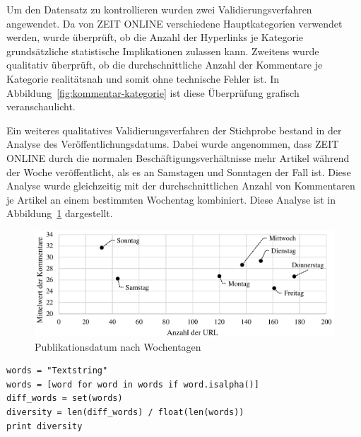 \documentclass[12pt,a4paper,oneside]{article}
\begin{document}
\begin{titlepage}
\begin{flushleft}
Um den Datensatz zu kontrollieren wurden zwei Validierungsverfahren angewendet. Da von ZEIT ONLINE verschiedene Hauptkategorien verwendet werden, wurde überprüft, ob die Anzahl der Hyperlinks je Kategorie grundsätzliche statistische Implikationen zulassen kann. Zweitens wurde qualitativ
überprüft, ob die durchschnittliche Anzahl der Kommentare je Kategorie realitätsnah und somit ohne technische Fehler ist. In Abbildung~\ref{fig:kommentar-kategorie} ist diese Überprüfung grafisch veranschaulicht.

Ein weiteres qualitatives Validierungsverfahren der Stichprobe bestand in der Analyse des Veröffentlichungsdatums. Dabei wurde angenommen, dass ZEIT ONLINE durch die normalen Beschäftigungsverhältnisse mehr Artikel während der Woche veröffentlicht, als es an Samstagen und Sonntagen der Fall ist. Diese Analyse wurde gleichzeitig mit der durchschnittlichen Anzahl von Kommentaren je Artikel an einem bestimmten Wochentag kombiniert. Diese Analyse ist in Abbildung~\ref{fig:kommentar-wochentag} dargestellt.

\begin{figure}[h!]
\includegraphics[width=.90\textwidth]{Kom_Wt.pdf}
\caption{Publikationsdatum nach Wochentagen}
\label{fig:kommentar-wochentag}
\end{figure}

\newpage

\begin{footnotesize}
\begin{verbatim}
words = "Textstring"
words = [word for word in words if word.isalpha()]
diff_words = set(words)
diversity = len(diff_words) / float(len(words))
print diversity
\end{verbatim}
\end{footnotesize}



\end{flushleft}
\end{titlepage}
\end{document}
